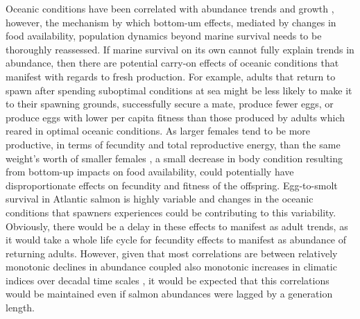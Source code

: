 \documentclass[12pt]{article}
\begin{document}
Oceanic conditions have been correlated with abundance trends and growth
\citep{Todd2008}, however, the mechanism by which bottom-um effects, mediated by changes in food availability,
population dynamics beyond marine survival needs to
be thoroughly reassessed. If marine survival on its own cannot fully explain
trends in abundance, then there are potential carry-on effects of oceanic
conditions that manifest with regards to fresh production. 
For example, adults
that return to spawn after spending suboptimal conditions at sea might be less
likely to make it to their spawning grounds, successfully secure a mate,
produce fewer eggs, or produce eggs with lower per capita fitness than those
produced by adults which reared in optimal oceanic conditions.
As larger females tend to be more productive, in terms of fecundity and total
reproductive energy, than the same weight's worth of smaller females
\citep{Barneche2018}, a small decrease in body condition resulting from bottom-up
impacts on food availability, could potentially have disproportionate effects on fecundity
and fitness of the offspring.
Egg-to-smolt survival in Atlantic salmon is highly variable \citep{Chaput2015}
and changes in the oceanic conditions that spawners experiences could be
contributing to this variability.
Obviously, there would be a delay in these effects to manifest as adult
trends, as it would take a whole life cycle for fecundity effects to manifest
as abundance of returning adults.
However, given that most correlations are between relatively monotonic declines
in abundance coupled also monotonic increases in climatic indices
over decadal time scales \citep[e.g.,][]{Friedland1998, Todd2008,
    Beaugrand2012}, it would be expected that this correlations would be
maintained even if salmon abundances were lagged by a generation length.
\end{document}
